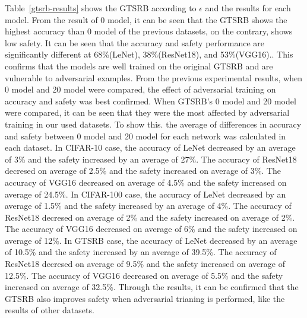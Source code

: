 \documentclass[journal,article,submit,moreauthors,pdftex]{Definitions/mdpi}
\begin{document}
Table~\ref{gtsrb-results} shows the GTSRB according to \begin{math}\epsilon\end{math} and the results for each model.
From the result of 0 model, it can be seen that the GTSRB shows the highest accuracy than 0 model of the previous datasets, on the contrary, shows low safety.
It can be seen that the accuracy and safety performance are significantly different at 68\%(LeNet), 38\%(ResNet18), and 53\%(VGG16)..
This confirms that the models are well trained on the original GTSRB and are vulnerable to adversarial examples.
From the previous experimental results, when 0 model and 20 model were compared, the effect of adversarial training on accuracy and safety was best confirmed.
When GTSRB's 0 model and 20 model were compared, it can be seen that they were the most affected by adversarial training in our used datasets.
To show this. the average of differences in accuracy and safety between 0 model and 20 model for each network was calculated in each dataset.
In CIFAR-10 case, the accuracy of LeNet decreased by an average of 3\% and the safety increased by an average of 27\%.
The accuracy of ResNet18 decresed on average of 2.5\% and the safety increased on average of 3\%.
The accuracy of VGG16 decreased on average of 4.5\% and the safety increased on average of 24.5\%.
In CIFAR-100 case, the accuracy of LeNet decreased by an average of 1.5\% and the safety increased by an average of 4\%.
The accuracy of ResNet18 decresed on average of 2\% and the safety increased on average of 2\%.
The accuracy of VGG16 decreased on average of 6\% and the safety increased on average of 12\%.
In GTSRB case, the accuracy of LeNet decreased by an average of 10.5\% and the safety increased by an average of 39.5\%.
The accuracy of ResNet18 decresed on average of 9.5\% and the safety increased on average of 12.5\%.
The accuracy of VGG16 decreased on average of 5.5\% and the safety increased on average of 32.5\%.
Through the results, it can be confirmed that the GTSRB also improves safety when adversarial trianing is performed, like the results of other datasets.
\end{document}
